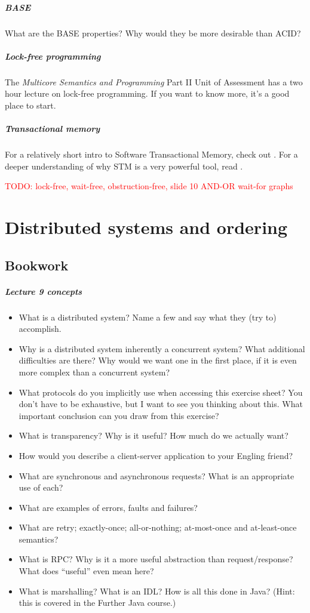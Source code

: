 \documentclass[12pt,a4paper,oneside,openright]{report}
\newcommand{\question}[2]{\paragraph{#1} #2}
\newcommand{\todo}[1]{\textcolor{red}{TODO: #1}}
\begin{document}
\question{BASE}{What are the BASE properties? Why would they be more
  desirable than ACID?}

\question{Lock-free programming}{The \emph{Multicore Semantics and
    Programming} Part II Unit of Assessment has a two hour lecture on
  lock-free programming. If you want to know more, it's a good place
  to start.}

\question{Transactional memory}{For a relatively short intro to
  Software Transactional Memory, check out
  \cite[Chapter~18]{ArtMultiprocessorProgramming}. For a deeper
  understanding of why STM is a very powerful tool, read \cite{CMT}.}

\todo{lock-free, wait-free, obstruction-free, slide 10 AND-OR wait-for
  graphs}

\chapter{Distributed systems and ordering}

\section{Bookwork}

\question{Lecture 9 concepts}{
  \begin{itemize}
  \item What is a distributed system? Name a few and say what they
    (try to) accomplish.
  \item Why is a distributed system inherently a concurrent system?
    What additional difficulties are there? Why would we want one in
    the first place, if it is even more complex than a concurrent
    system?
  \item What protocols do you implicitly use when accessing this
    exercise sheet? You don't have to be exhaustive, but I want to see
    you thinking about this. What important conclusion can you draw
    from this exercise?
  \item What is transparency? Why is it useful? How much do we
    actually want?
  \item How would you describe a client-server application to your
    Engling friend?
  \item What are synchronous and asynchronous requests? What is an
    appropriate use of each?
  \item What are examples of errors, faults and failures?
  \item What are retry; exactly-once; all-or-nothing; at-most-once and
    at-least-once semantics?
  \item What is RPC? Why is it a more useful abstraction than
    request/response? What does ``useful'' even mean here?
  \item What is marshalling? What is an IDL? How is all this done in
    Java? (Hint: this is covered in the Further Java course.)
  \end{itemize}
}
\end{document}

